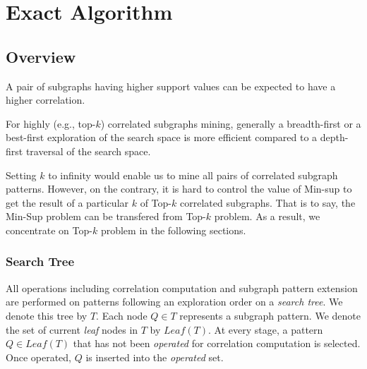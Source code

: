 \chapter{Exact Algorithm}
\label{sec:exact_algo}

\section{Overview}
\label{subsec:exact_algo_overview}

\begin{observation}
	\label{ob:frequency}
	A pair of subgraphs having higher support values can be expected to 
	have a higher correlation.
\end{observation}

\begin{observation}
	\label{ob:dfs}
	For highly (e.g., top-$k$) correlated subgraphs mining, generally a
	breadth-first or a best-first exploration of the search space is more
	efficient compared to a depth-first traversal of the search space.
\end{observation}

Setting $k$ to infinity would enable us to mine all pairs of correlated subgraph
patterns. However, on the contrary, it is hard to control the value of {\sf
Min-sup} to get the result of a particular $k$ of {\sf Top-$k$} correlated
subgraphs. That is to say, the {\sf Min-Sup} problem can be transfered from {\sf
Top-$k$} problem. As a result, we concentrate on {\sf Top-$k$} problem in the
following sections.

\subsection{Search Tree}
\label{subsubsec:exact_algo_searchtree}
All operations including correlation computation and subgraph pattern extension
are performed on patterns following an exploration order on a \textit{search tree}.
We denote this tree by $T$. Each node $Q\in T$ represents a subgraph pattern. We
denote the set of current \textit{leaf} nodes in $T$ by $Leaf(T)$. At
every stage, a pattern $Q\in Leaf(T)$ that has not been \textit{operated} for correlation
computation is selected. Once operated, $Q$ is inserted into the
\textit{operated} set.


